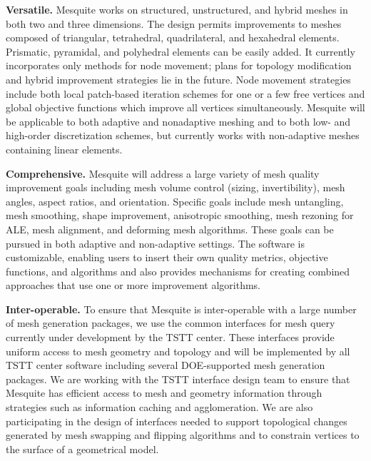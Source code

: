 \documentclass[letter]{report}
\begin{document}
{\bf Versatile.}  Mesquite works on structured, unstructured, and
hybrid meshes in both two and three dimensions. The design permits
improvements to meshes composed of triangular, tetrahedral,
quadrilateral, and hexahedral elements. Prismatic, pyramidal, and
polyhedral elements can be easily added.  It currently incorporates
only methods for node movement; plans for topology modification and
hybrid improvement strategies lie in the future.  Node movement
strategies include both local patch-based iteration schemes for one or
a few free vertices and global objective functions which improve all
vertices simultaneously. Mesquite will be applicable to both adaptive
and nonadaptive meshing and to both low- and high-order discretization
schemes, but currently works with non-adaptive meshes containing
linear elements. \newline

{\bf Comprehensive.}  Mesquite will address a large variety of mesh
quality improvement goals including mesh volume control (sizing,
invertibility), mesh angles, aspect ratios, and orientation. Specific
goals include mesh untangling, mesh smoothing, shape improvement,
anisotropic smoothing, mesh rezoning for ALE, mesh alignment, and
deforming mesh algorithms. These goals can be pursued in both adaptive
and non-adaptive settings. The software is customizable, enabling
users to insert their own quality metrics, objective functions, and
algorithms and also provides mechanisms for creating combined
approaches that use one or more improvement algorithms. \newline


{\bf Inter-operable.}  To ensure that Mesquite is inter-operable with a
large number of mesh generation packages, we use the common
interfaces for mesh query currently under development by the TSTT
center.  These interfaces provide uniform access to mesh geometry and
topology and will be implemented by all TSTT center software including
several DOE-supported mesh generation packages.  We are working with
the TSTT interface design team to ensure that Mesquite has efficient
access to mesh and geometry information through strategies such as
information caching and agglomeration.  We are also participating in
the design of interfaces needed to support topological changes
generated by mesh swapping and flipping algorithms and to constrain
vertices to the surface of a geometrical model. \newline
\end{document}
